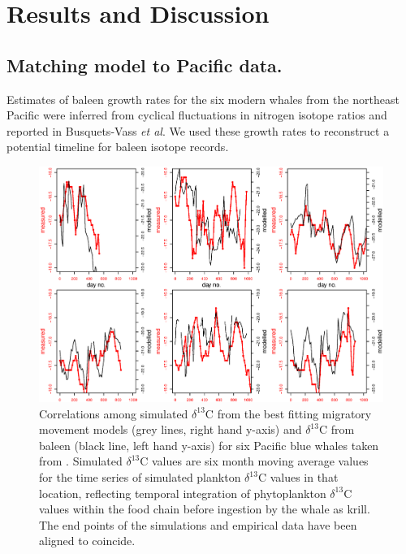 \documentclass[a4paper,12pt]{article}
\begin{document}
\section{Results and Discussion}

\subsection{Matching model to Pacific data.}

Estimates of baleen growth rates for the six modern whales from the northeast Pacific were inferred from cyclical fluctuations in nitrogen isotope ratios and reported in Busquets-Vass \textit{et al}\cite{busquets2017estimating}. 
We used these growth rates to reconstruct a potential timeline for baleen isotope records.

\begin{figure}
 \centering
  \includegraphics[width = \linewidth]{figures/figure-Pacific-draft.eps}
  \caption{Correlations among simulated $\delta^{13}$C from the best fitting migratory movement models (grey lines, right hand y-axis) and $\delta^{13}$C from baleen (black line, left hand y-axis) for six Pacific blue whales taken from \cite{busquets2017estimating}. 
  Simulated $\delta^{13}$C values are six month moving average values for the time series of simulated plankton $\delta^{13}$C values in that location, reflecting temporal integration of phytoplankton $\delta^{13}$C values within the food chain before ingestion by the whale as krill. 
  The end points of the simulations and empirical data have been aligned to coincide.
}
  \label{pacific}
\end{figure}
\end{document}
